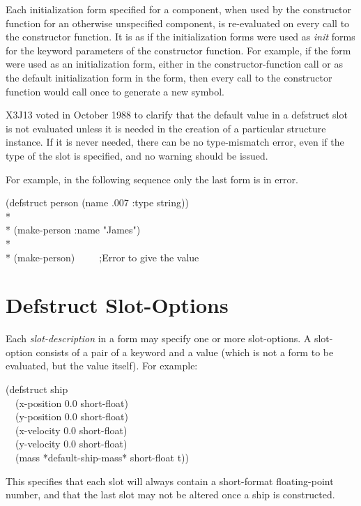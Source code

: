 Each initialization form specified for a  component,
when used by the constructor function for an otherwise unspecified
component, is re-evaluated on every call to the
constructor function.  It is as if the initialization forms were
used as \emph{init} forms for the keyword parameters of the
constructor function.
For example, if the form 
were used as an initialization form,
either in the constructor-function call or as the default initialization form
in the  form,
then every call to the constructor
function would call  once to generate a new symbol.

\begin{newer}
X3J13 voted in October 1988 
to clarify that the default value in a defstruct slot is not evaluated 
        unless it is needed in the creation of a particular structure
        instance.  If it is never needed, there can be no type-mismatch
        error, even if the type of the slot is specified, and no warning
        should be issued.


For example, in the following sequence only the last form is in error.
\begin{lisp}
(defstruct person (name .007 :type string)) \\*
\\*
(make-person :name "James") \\*
\\*
(make-person)~~~~~;\textrm{Error to give  the value }
\end{lisp}
\end{newer}


\section{Defstruct Slot-Options}
\label{Defstruct-Slot-Options}

Each \emph{slot-description} in a  form may specify one or more
slot-options.  A slot-option consists of a pair of a keyword and
a value (which is not a form to be evaluated, but the value itself).
For example:
\begin{lisp}
(defstruct ship \\
~~(x-position 0.0  short-float) \\
~~(y-position 0.0  short-float) \\
~~(x-velocity 0.0  short-float) \\
~~(y-velocity 0.0  short-float) \\
~~(mass *default-ship-mass*  short-float  t))
\end{lisp}
This specifies that each slot will always contain a
short-format floating-point number,
and that the last slot may not be altered once a ship is constructed.

